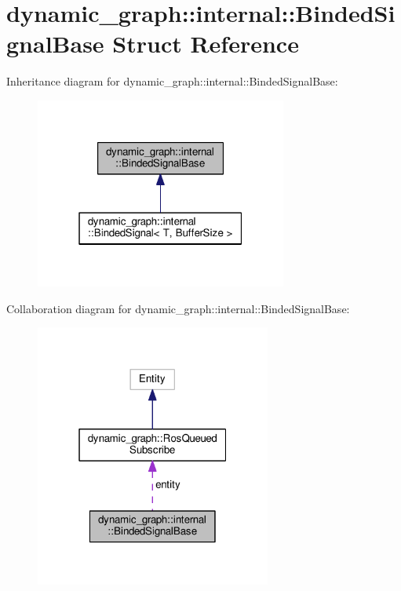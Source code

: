 \hypertarget{structdynamic__graph_1_1internal_1_1BindedSignalBase}{}\section{dynamic\+\_\+graph\+:\+:internal\+:\+:Binded\+Signal\+Base Struct Reference}
\label{structdynamic__graph_1_1internal_1_1BindedSignalBase}


Inheritance diagram for dynamic\+\_\+graph\+:\+:internal\+:\+:Binded\+Signal\+Base\+:\nopagebreak
\begin{figure}[H]
\begin{center}
\leavevmode
\includegraphics[width=235pt]{structdynamic__graph_1_1internal_1_1BindedSignalBase__inherit__graph}
\end{center}
\end{figure}


Collaboration diagram for dynamic\+\_\+graph\+:\+:internal\+:\+:Binded\+Signal\+Base\+:\nopagebreak
\begin{figure}[H]
\begin{center}
\leavevmode
\includegraphics[width=220pt]{structdynamic__graph_1_1internal_1_1BindedSignalBase__coll__graph}
\end{center}
\end{figure}
